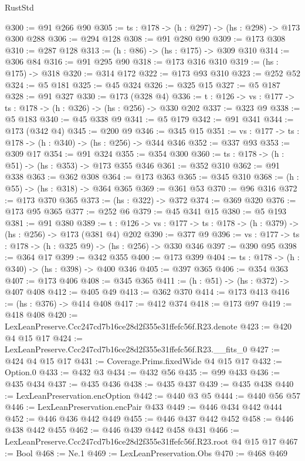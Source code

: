 \begin{lexlean}{RustStd}
\begin{coremodule}
@300 := @91 @266 @90
@305 := {ts : @178} -> (h : @297) -> (hs : @298) -> @173 @300 @288
@306 := @294 @128
@308 := @91 @280 @90
@309 := @173 @308
@310 := @287 @128
@313 := (h : @86) -> (hs : @175) -> @309 @310
@314 := @306 @84
@316 := @91 @295 @90
@318 := @173 @316 @310
@319 := (hs : @175) -> @318
@320 := @314 @172
@322 := @173 @93 @310
@323 := @252 @52
@324 := @5 @181
@325 := @45 @324
@326 := @325 @15
@327 := @5 @187
@328 := @91 @327
@330 := @173 (@328 @4)
@336 := {t : @126} -> {vs : @177} -> {ts : @178} -> (h : @326) -> (hs : @256) -> @330 @202
@337 := @323 @9
@338 := @5 @183
@340 := @45 @338 @9
@341 := @5 @179
@342 := @91 @341
@344 := @173 (@342 @4)
@345 := @200 @9
@346 := @345 @15
@351 := {vs : @177} -> {ts : @178} -> (h : @340) -> (hs : @256) -> @344 @346
@352 := @337 @93
@353 := @309 @17
@354 := @91 @324
@355 := @354 @300
@360 := {ts : @178} -> (h : @51) -> (hs : @353) -> @173 @355 @346
@361 := @352 @310
@362 := @91 @338
@363 := @362 @308
@364 := @173 @363
@365 := @345 @310
@368 := (h : @55) -> (hs : @318) -> @364 @365
@369 := @361 @53
@370 := @96 @316
@372 := @173 @370 @365
@373 := (hs : @322) -> @372
@374 := @369 @320
@376 := @173 @95 @365
@377 := @252 @6
@379 := @45 @341 @15
@380 := @5 @193
@381 := @91 @380
@389 := {t : @126} -> {vs : @177} -> {ts : @178} -> (h : @379) -> (hs : @256) -> @173 (@381 @4) @202
@390 := @377 @9
@396 := {vs : @177} -> {ts : @178} -> (h : @325 @9) -> (hs : @256) -> @330 @346
@397 := @390 @95
@398 := @364 @17
@399 := @342 @355
@400 := @173 @399
@404 := {ts : @178} -> (h : @340) -> (hs : @398) -> @400 @346
@405 := @397 @365
@406 := @354 @363
@407 := @173 @406
@408 := @345 @365
@411 := (h : @51) -> (hs : @372) -> @407 @408
@412 := @405 @49
@413 := @362 @370
@414 := @173 @413
@416 := (hs : @376) -> @414 @408
@417 := @412 @374
@418 := @173 @97
@419 := @418 @408
@420 := LexLeanPreserve.Ccc247cd7b16ce28d2f355e31ffefc56f.R23.denote
@423 := @420 @4 @15 @17
@424 := LexLeanPreserve.Ccc247cd7b16ce28d2f355e31ffefc56f.R23.__fits_0
@427 := @424 @4 @15 @17
@431 := Coverage.Prims.fixedWide @4 @15 @17
@432 := Option.{0}
@433 := @432 @3
@434 := @432 @56
@435 := @99 @433
@436 := @435 @434
@437 := @435 @436
@438 := @435 @437
@439 := @435 @438
@440 := LexLeanPreservation.encOption
@442 := @440 @3 @5
@444 := @440 @56 @57
@446 := LexLeanPreservation.encPair @433
@449 := @446 @434 @442 @444
@452 := @446 @436 @442 @449
@455 := @446 @437 @442 @452
@458 := @446 @438 @442 @455
@462 := @446 @439 @442 @458 @431
@466 := LexLeanPreserve.Ccc247cd7b16ce28d2f355e31ffefc56f.R23.root @4 @15 @17
@467 := Bool
@468 := Ne.{1}
@469 := LexLeanPreservation.Obs
@470 := @468 @469

\end{coremodule}
\end{lexlean}
